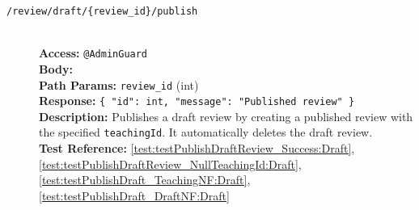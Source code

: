 \begin{description}
	\item[\POST \quad \texttt{/review/draft/\{review\_id\}/publish}] \hfill \\
	\textbf{Access:} \texttt{@AdminGuard} \\
	\textbf{Body:} \texttt{} \\
	\textbf{Path Params:} \texttt{review\_id} (int) \\
	\textbf{Response:} \texttt{\{ "id": int, "message": "Published review" \}} \\
	\textbf{Description:} Publishes a draft review by creating a published review with the specified \texttt{teachingId}. It automatically deletes the draft review.\\
	\textbf{Test Reference:} \ref{test:testPublishDraftReview_Success:Draft}, \ref{test:testPublishDraftReview_NullTeachingId:Draft}, \ref{test:testPublishDraft_TeachingNF:Draft}, \ref{test:testPublishDraft_DraftNF:Draft}
\end{description}

